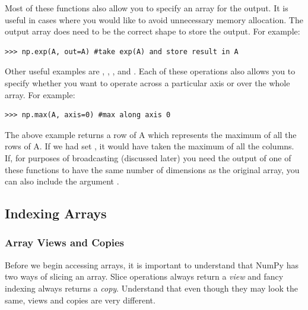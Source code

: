 Most of these functions also allow you to specify an array for the output.
It is useful in cases where you would like to avoid unnecessary memory allocation.
The output array does need to be the correct shape to store the output.
For example:
\begin{lstlisting}
>>> np.exp(A, out=A) #take exp(A) and store result in A
\end{lstlisting}

Other useful examples are , , , and .
Each of these operations also allows you to specify whether you want to operate across a particular axis or over the whole array.
For example:
\begin{lstlisting}
>>> np.max(A, axis=0) #max along axis 0
\end{lstlisting}
The above example returns a row of A which represents the maximum of all the rows of A.
If we had set , it would have taken the maximum of all the columns.
If, for purposes of broadcasting (discussed later) you need the output of one of these functions to have the same number of dimensions as the original array, you can also include the argument .

\subsection*{Indexing Arrays}
\subsubsection*{Array Views and Copies}
Before we begin accessing arrays, it is important to understand that NumPy has two 
ways of slicing an array.
Slice operations always return a \emph{view} and fancy indexing always returns a \emph{copy}.
Understand that even though they may look the same, views and copies are very different.

